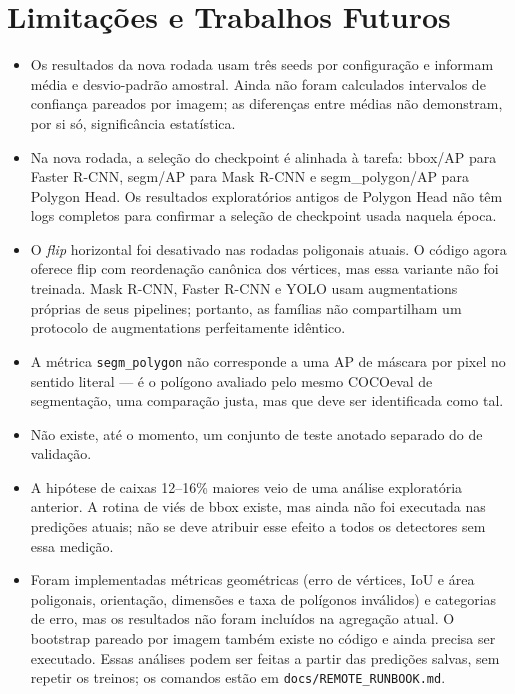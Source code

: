 \documentclass[11pt]{article}
\begin{document}
\section{Limitações e Trabalhos Futuros}
\label{sec:limitacoes}

\begin{itemize}
\item Os resultados da nova rodada usam três seeds por configuração e informam
média e desvio-padrão amostral. Ainda não foram calculados intervalos de confiança
pareados por imagem; as diferenças entre médias não demonstram, por si só,
significância estatística.

\item Na nova rodada, a seleção do checkpoint é alinhada à tarefa: bbox/AP para
Faster R-CNN, segm/AP para Mask R-CNN e segm\_polygon/AP para Polygon Head. Os
resultados exploratórios antigos de Polygon Head não têm logs completos para
confirmar a seleção de checkpoint usada naquela época.

\item O \textit{flip} horizontal foi desativado nas rodadas poligonais atuais.
O código agora oferece flip com reordenação canônica dos vértices, mas essa
variante não foi treinada. Mask R-CNN, Faster R-CNN e YOLO usam augmentations
próprias de seus pipelines; portanto, as famílias não compartilham um protocolo
de augmentations perfeitamente idêntico.

\item A métrica \texttt{segm\_polygon} não corresponde a uma AP de máscara por
pixel no sentido literal --- é o polígono avaliado pelo mesmo COCOeval de
segmentação, uma comparação justa, mas que deve ser identificada como tal.

\item Não existe, até o momento, um conjunto de teste anotado separado do de
validação.

\item A hipótese de caixas 12--16\% maiores veio de uma análise exploratória
anterior. A rotina de viés de bbox existe, mas ainda não foi executada nas
predições atuais; não se deve atribuir esse efeito a todos os detectores sem essa
medição.

\item Foram implementadas métricas geométricas (erro de vértices, IoU e área
poligonais, orientação, dimensões e taxa de polígonos inválidos) e categorias de
erro, mas os resultados não foram incluídos na agregação atual. O bootstrap
pareado por imagem também existe no código e ainda precisa ser executado. Essas
análises podem ser feitas a partir das predições salvas, sem repetir os treinos;
os comandos estão em \texttt{docs/REMOTE\_RUNBOOK.md}.


\end{itemize}
\end{document}
